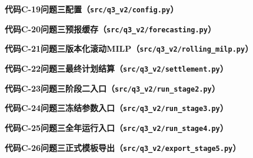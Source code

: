 \documentclass[zihao=-4,a4paper,UTF8,fontset=none]{ctexart}
\begin{document}
\begin{center}\textbf{代码C-19\quad 问题三配置（\texttt{src/q3\_v2/config.py}）}\end{center}

\begin{center}\textbf{代码C-20\quad 问题三预报缓存（\texttt{src/q3\_v2/forecasting.py}）}\end{center}

\begin{center}\textbf{代码C-21\quad 问题三版本化滚动MILP（\texttt{src/q3\_v2/rolling\_milp.py}）}\end{center}

\begin{center}\textbf{代码C-22\quad 问题三最终计划结算（\texttt{src/q3\_v2/settlement.py}）}\end{center}

\begin{center}\textbf{代码C-23\quad 问题三阶段二入口（\texttt{src/q3\_v2/run\_stage2.py}）}\end{center}

\begin{center}\textbf{代码C-24\quad 问题三冻结参数入口（\texttt{src/q3\_v2/run\_stage3.py}）}\end{center}

\begin{center}\textbf{代码C-25\quad 问题三全年运行入口（\texttt{src/q3\_v2/run\_stage4.py}）}\end{center}

\begin{center}\textbf{代码C-26\quad 问题三正式模板导出（\texttt{src/q3\_v2/export\_stage5.py}）}\end{center}

\end{document}
